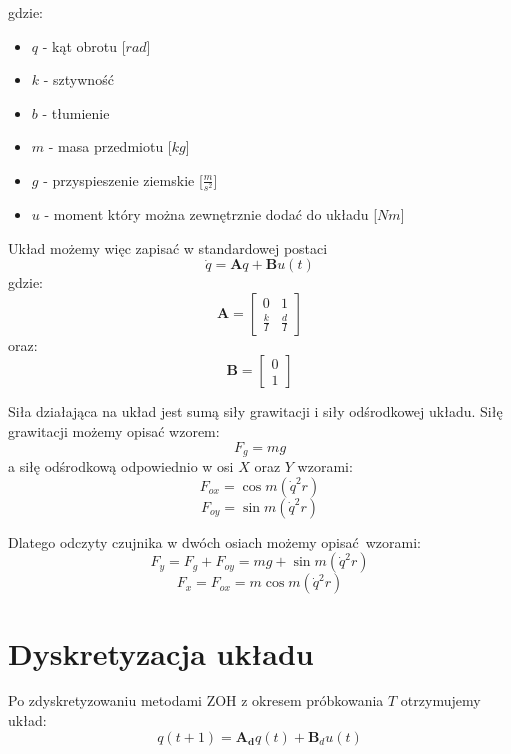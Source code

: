 \documentclass[a4paper, 10pt]{article}
\begin{document}
gdzie:
\begin{itemize}
	\item $q$ - kąt obrotu [$rad$]
	\item $k$ - sztywność
	\item $b$ - tłumienie
	\item $m$ - masa przedmiotu [$kg$]
	\item $g$ - przyspieszenie ziemskie [$\frac{m}{s^2}$]
	\item $u$ - moment który można zewnętrznie dodać do układu [$Nm$]
\end{itemize}

Układ możemy więc zapisać w standardowej postaci
\begin{equation}
\dot{q} = \textbf{A}q + \textbf{B}u(t)
\end{equation}
gdzie:
\begin{equation}
\mathbf{A} = 	\begin{bmatrix}
	    0 & 1 \\
	    \frac{k}{I} & \frac{d}{I}
	\end{bmatrix}
\end{equation}
oraz:
\begin{equation}
\mathbf{B} = \begin{bmatrix}
	    0 \\
	    1
	\end{bmatrix}
\end{equation}

Siła działająca na układ jest sumą siły grawitacji i siły odśrodkowej układu.
Siłę grawitacji możemy opisać wzorem:
\begin{equation}
F_g = mg
\end{equation}
a siłę odśrodkową odpowiednio w osi $X$ oraz $Y$ wzorami:
\begin{equation}
F_{ox} =  \cos{m(\dot{q}^2 r)}
\end{equation}
\begin{equation}
F_{oy} =  \sin{m(\dot{q}^2 r)}
\end{equation}


Dlatego odczyty czujnika w dwóch osiach możemy opisać wzorami:
\begin{equation}
F_y = F_g + F_{oy} = mg + \sin{m(\dot{q}^2 r)}
\end{equation}
\begin{equation}
F_x = F_{ox} = m\cos{m(\dot{q}^2 r)}
\end{equation}

\section{Dyskretyzacja układu}
Po zdyskretyzowaniu metodami ZOH z okresem próbkowania $T$ otrzymujemy układ:
\begin{equation}
q(t+1) = \mathbf{A_d}q(t) + \mathbf{B}_du(t)
\label{eq:dyskretny}
\end{equation}
\end{document}
